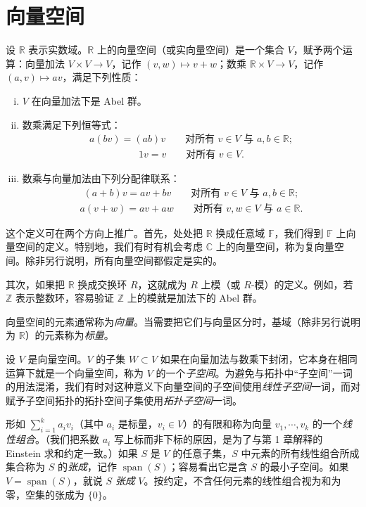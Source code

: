 \documentclass[../../main.tex]{subfiles}
\begin{document}
\section{向量空间}\label{section:appB-vector-spaces}

设 $\mathbb R$ 表示实数域。$\mathbb R$ 上的向量空间（或实向量空间）是一个集合 $V$，赋予两个运算：向量加法 $V\times V\to V$，记作 $(v,w)\mapsto v+w$；数乘 $\mathbb R\times V\to V$，记作 $(a,v)\mapsto av$，满足下列性质：
\begin{enumerate}[(i)]
\item $V$ 在向量加法下是 Abel 群。
\item 数乘满足下列恒等式：
\begin{align*}
a(bv)=(ab)v\qquad\text{对所有 }v\in V\text{ 与 }a,b\in\mathbb R;
\end{align*}
\begin{align*}
1v=v\qquad\text{对所有 }v\in V.
\end{align*}
\item 数乘与向量加法由下列分配律联系：
\begin{align*}
(a+b)v=av+bv\qquad\text{对所有 }v\in V\text{ 与 }a,b\in\mathbb R;
\end{align*}
\begin{align*}
a(v+w)=av+aw\qquad\text{对所有 }v,w\in V\text{ 与 }a\in\mathbb R.
\end{align*}
\end{enumerate}

这个定义可在两个方向上推广。首先，处处把 $\mathbb R$ 换成任意域 $\mathbb F$，我们得到 $\mathbb F$ 上向量空间的定义。特别地，我们有时有机会考虑 $\mathbb C$ 上的向量空间，称为复向量空间。除非另行说明，所有向量空间都假定是实的。

其次，如果把 $\mathbb R$ 换成交换环 $R$，这就成为 $R$ 上模（或 $R$-模）的定义。例如，若 $\mathbb Z$ 表示整数环，容易验证 $\mathbb Z$ 上的模就是加法下的 Abel 群。

向量空间的元素通常称为\emph{向量}。当需要把它们与向量区分时，基域（除非另行说明为 $\mathbb R$）的元素称为\emph{标量}。

设 $V$ 是向量空间。$V$ 的子集 $W\subset V$ 如果在向量加法与数乘下封闭，它本身在相同运算下就是一个向量空间，称为 $V$ 的一个\emph{子空间}。为避免与拓扑中“子空间”一词的用法混淆，我们有时对这种意义下向量空间的子空间使用\emph{线性子空间}一词，而对赋予子空间拓扑的拓扑空间子集使用\emph{拓扑子空间}一词。

形如 $\sum_{i=1}^k a_i v_i$（其中 $a_i$ 是标量，$v_i\in V$）的有限和称为向量 $v_1,\cdots ,v_k$ 的一个\emph{线性组合}。（我们把系数 $a_i$ 写上标而非下标的原因，是为了与第 1 章解释的 Einstein 求和约定一致。）如果 $S$ 是 $V$ 的任意子集，$S$ 中元素的所有线性组合所成集合称为 $S$ 的\emph{张成}，记作 $\operatorname{span}(S)$；容易看出它是含 $S$ 的最小子空间。如果 $V=\operatorname{span}(S)$，就说 $S$ \emph{张成} $V$。按约定，不含任何元素的线性组合视为和为零，空集的张成为 $\{0\}$。
\end{document}

